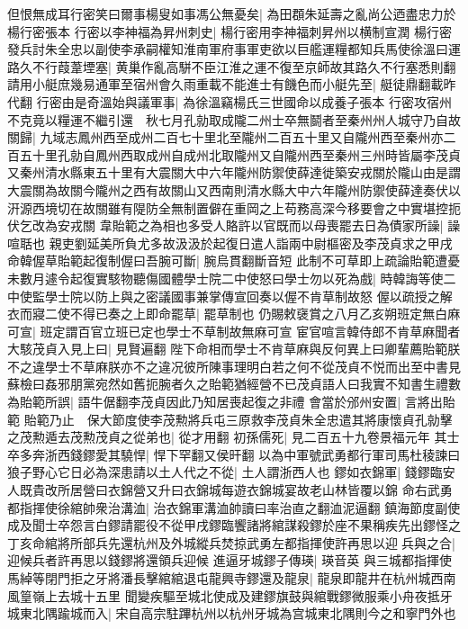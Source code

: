 但恨無成耳行密笑曰爾事楊叟如事馮公無憂矣|{
	為田頵朱延壽之亂尚公迺盡忠力於楊行密張本}
行密以李神福為昇州刺史|{
	楊行密用李神福刺昇州以横制宣潤}
楊行密發兵討朱全忠以副使李承嗣權知淮南軍府事軍吏欲以巨艦運糧都知兵馬使徐溫曰運路久不行葭葦堙塞|{
	黄巢作亂高駢不臣江淮之運不復至京師故其路久不行塞悉則翻}
請用小艇庶幾易通軍至宿州會久雨重載不能進士有饑色而小艇先至|{
	艇徒鼎翻載昨代翻}
行密由是奇溫始與議軍事|{
	為徐溫竊楊氏三世國命以成養子張本}
行密攻宿州不克竟以糧運不繼引還　秋七月孔勍取成隴二州士卒無鬬者至秦州州人城守乃自故關歸|{
	九域志鳳州西至成州二百七十里北至隴州二百五十里又自隴州西至秦州亦二百五十里孔勍自鳳州西取成州自成州北取隴州又自隴州西至秦州三州時皆屬李茂貞又秦州清水縣東五十里有大震關大中六年隴州防禦使薛達徙築安戎關於隴山由是謂大震關為故關今隴州之西有故關山又西南則清水縣大中六年隴州防禦使薛達奏伏以汧源西境切在故關雖有隄防全無制置僻在重岡之上苟務高深今移要會之中實堪控扼伏乞改為安戎關}
韋貽範之為相也多受人賂許以官既而以母喪罷去日為債家所譟|{
	譟喧聒也}
親吏劉延美所負尤多故汲汲於起復日遣人詣兩中尉樞密及李茂貞求之甲戌命韓偓草貽範起復制偓曰吾腕可斷|{
	腕烏貫翻斷音短}
此制不可草即上疏論貽範遭憂未數月遽令起復實駭物聽傷國體學士院二中使怒曰學士勿以死為戲|{
	時韓誨等使二中使監學士院以防上與之密議國事兼掌傳宣回奏以偓不肯草制故怒}
偓以疏授之解衣而寢二使不得已奏之上即命罷草|{
	罷草制也}
仍賜敕襃賞之八月乙亥朔班定無白麻可宣|{
	班定謂百官立班已定也學士不草制故無麻可宣}
宦官喧言韓侍郎不肯草麻聞者大駭茂貞入見上曰|{
	見賢遍翻}
陛下命相而學士不肯草麻與反何異上曰卿輩薦貽範朕不之違學士不草麻朕亦不之違况彼所陳事理明白若之何不從茂貞不悦而出至中書見蘇檢曰姦邪朋黨宛然如舊扼腕者久之貽範猶經營不已茂貞語人曰我實不知書生禮數為貽範所誤|{
	語牛倨翻李茂貞因此乃知居喪起復之非禮}
會當於邠州安置|{
	言將出貽範}
貽範乃止　保大節度使李茂勲將兵屯三原救李茂貞朱全忠遣其將康懷貞孔勍擊之茂勲遁去茂勲茂貞之從弟也|{
	從才用翻}
初孫儒死|{
	見二百五十九卷景福元年}
其士卒多奔浙西錢鏐愛其驍悍|{
	悍下罕翻又侯旰翻}
以為中軍號武勇都行軍司馬杜稜諫曰狼子野心它日必為深患請以土人代之不從|{
	土人謂浙西人也}
鏐如衣錦軍|{
	錢鏐臨安人既貴改所居營曰衣錦營又升曰衣錦城每遊衣錦城宴故老山林皆覆以錦}
命右武勇都指揮使徐綰帥衆治溝洫|{
	治衣錦軍溝洫帥讀曰率治直之翻洫泥逼翻}
鎮海節度副使成及聞士卒怨言白鏐請罷役不從甲戌鏐臨饗諸將綰謀殺鏐於座不果稱疾先出鏐怪之丁亥命綰將所部兵先還杭州及外城縱兵焚掠武勇左都指揮使許再思以迎兵與之合|{
	迎候兵者許再思以錢鏐將還領兵迎候}
進逼牙城鏐子傳瑛|{
	瑛音英}
與三城都指揮使馬綽等閉門拒之牙將潘長擊綰綰退屯龍興寺鏐還及龍泉|{
	龍泉即龍井在杭州城西南風篁嶺上去城十五里}
聞變疾驅至城北使成及建鏐旗鼓與綰戰鏐微服乘小舟夜抵牙城東北隅踰城而入|{
	宋自高宗駐蹕杭州以杭州牙城為宫城東北隅則今之和寧門外也}
